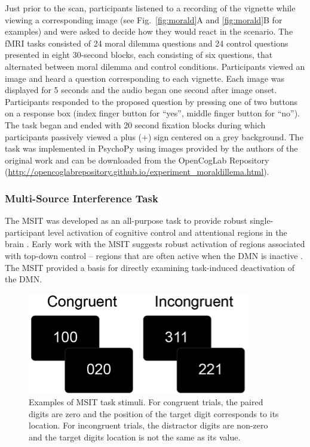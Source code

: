 Just prior to the scan, participants listened to a recording of the vignette while viewing a corresponding image (see Fig.~\ref{fig:morald}A and \ref{fig:morald}B for examples) and were asked to decide how they would react in the scenario. The fMRI tasks consisted of 24 moral dilemma questions and 24 control questions presented in eight 30-second blocks, each consisting of six questions, that alternated between moral dilemma and control conditions. Participants viewed an image and heard a question corresponding to each vignette. Each image was displayed for 5 seconds and the audio began one second after image onset. Participants responded to the proposed question by pressing one of two buttons on a response box (index finger button for “yes”, middle finger button for “no”). The task began and ended with 20 second fixation blocks during which participants passively viewed a plus (+) sign centered on a grey background. The task was implemented in PsychoPy \cite{Peirce2008} using images provided by the authors of the original work \cite{Harrison2008} and can be downloaded from the OpenCogLab Repository (\url{http://opencoglabrepository.github.io/experiment\_moraldillema.html}).

\subsubsection{Multi-Source Interference Task}
The MSIT was developed as an all-purpose task to provide robust single-participant level activation of cognitive control and attentional regions in the brain \cite{Bush2006}. Early work with the MSIT suggests robust activation of regions associated with top-down control – regions that are often active when the DMN is inactive \cite{Bush2006}. The MSIT provided a basis for directly examining task-induced deactivation of the DMN.

\begin{figure}[h!]
   \centering
   \includegraphics[]{msit_stim.png}
   \caption{Examples of MSIT task stimuli. For congruent trials, the paired digits are zero and the position of the target digit corresponds to its location. For incongruent trials, the distractor digits are non-zero and the target digits location is not the same as its value.}
   \label{fig:msit}
\end{figure}

